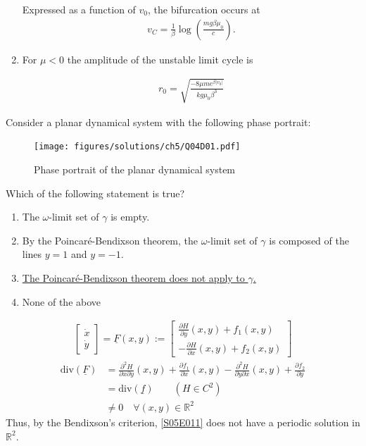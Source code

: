 \begin{solution}[4.4]
\begin{enumerate}
Expressed as a function of $v_0$, the bifurcation occurs at 
\begin{align}
v_C = \frac{1}{\beta}\log \left(\frac{mg\beta \mu_0}{c} \right).
\end{align}

\item For $\mu<0$ the amplitude of the unstable limit cycle is 

\begin{align}
r_0 = \sqrt{\frac{-8\mu m e^{\beta |v_0|}}{kg\mu_0 \beta^3}}
\end{align}
\end{enumerate}
\end{solution}

\begin{solution}[5.1]
Consider a planar dynamical system with the following phase portrait:

\begin{figure}[h]
	\centering
	\texttt{[image: figures/solutions/ch5/Q04D01.pdf]}
	\caption{Phase portrait of the planar dynamical system}
\end{figure}

Which of the following statement is true?

\begin{enumerate}
	\item The $\omega$-limit set of $\gamma$ is empty.
	\item By the Poincaré-Bendixson theorem, the $\omega$-limit set of $\gamma$ is composed of the lines $y = 1$ and $y = -1$.
	\item \underline{The Poincaré-Bendixson theorem does not apply to $\gamma$.}
	\item None of the above
\end{enumerate}
\end{solution}

\begin{solution}[5.2]
\begin{align}
	\begin{bmatrix}\label{S05E011}
		\dot{x} \\
		\dot{y}
	\end{bmatrix} =
	\underline{F}(x,y) := \begin{bmatrix}
		\displaystyle \frac{\partial H}{\partial y}(x,y) + f_1(x,y) \\
		\displaystyle -\frac{\partial H}{\partial x}(x,y) + f_2(x,y)
	\end{bmatrix}
\end{align}
\begin{align}
	\text{div}(\underline{F}) &= \frac{\partial^2 H}{\partial x \partial y}(x,y) + \frac{\partial f_1}{\partial x}(x,y) - \frac{\partial^2 H}{\partial y \partial x}(x,y) + \frac{\partial f_2}{\partial y} \\
	&= \text{div}(\underline{f}) \qquad (H \in C^2) \\
	&\neq 0 \quad \forall (x,y)\in \mathbb{R}^2
\end{align}
Thus, by the Bendixson's criterion, \eqref{S05E011} does not have a periodic solution in $\mathbb{R}^2$.
\end{solution}


